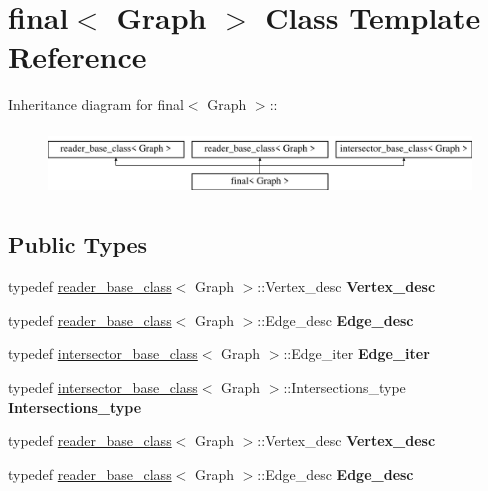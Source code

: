 \hypertarget{classfinal}{
\section{final$<$ Graph $>$ Class Template Reference}
\label{classfinal}
}
Inheritance diagram for final$<$ Graph $>$::\begin{figure}[H]
\begin{center}
\leavevmode
\includegraphics[height=1.78628cm]{classfinal}
\end{center}
\end{figure}
\subsection*{Public Types}
\begin{DoxyCompactItemize}
\item 
\hypertarget{classfinal_a71a55ce0e3a3e740da4d8958b2ce3b2a}{
typedef \hyperlink{classreader__base__class}{reader\_\-base\_\-class}$<$ Graph $>$::Vertex\_\-desc {\bfseries Vertex\_\-desc}}
\label{classfinal_a71a55ce0e3a3e740da4d8958b2ce3b2a}

\item 
\hypertarget{classfinal_a7a618f6a143db77a7ea54d7cd11ae607}{
typedef \hyperlink{classreader__base__class}{reader\_\-base\_\-class}$<$ Graph $>$::Edge\_\-desc {\bfseries Edge\_\-desc}}
\label{classfinal_a7a618f6a143db77a7ea54d7cd11ae607}

\item 
\hypertarget{classfinal_a22c478f61e09f8d21e659cda4a5ef674}{
typedef \hyperlink{classintersector__base__class}{intersector\_\-base\_\-class}$<$ Graph $>$::Edge\_\-iter {\bfseries Edge\_\-iter}}
\label{classfinal_a22c478f61e09f8d21e659cda4a5ef674}

\item 
\hypertarget{classfinal_a828f09fa919dbb68e143a6eb94e93696}{
typedef \hyperlink{classintersector__base__class}{intersector\_\-base\_\-class}$<$ Graph $>$::Intersections\_\-type {\bfseries Intersections\_\-type}}
\label{classfinal_a828f09fa919dbb68e143a6eb94e93696}

\item 
\hypertarget{classfinal_a71a55ce0e3a3e740da4d8958b2ce3b2a}{
typedef \hyperlink{classreader__base__class}{reader\_\-base\_\-class}$<$ Graph $>$::Vertex\_\-desc {\bfseries Vertex\_\-desc}}
\label{classfinal_a71a55ce0e3a3e740da4d8958b2ce3b2a}

\item 
\hypertarget{classfinal_a7a618f6a143db77a7ea54d7cd11ae607}{
typedef \hyperlink{classreader__base__class}{reader\_\-base\_\-class}$<$ Graph $>$::Edge\_\-desc {\bfseries Edge\_\-desc}}
\label{classfinal_a7a618f6a143db77a7ea54d7cd11ae607}

\end{DoxyCompactItemize}
